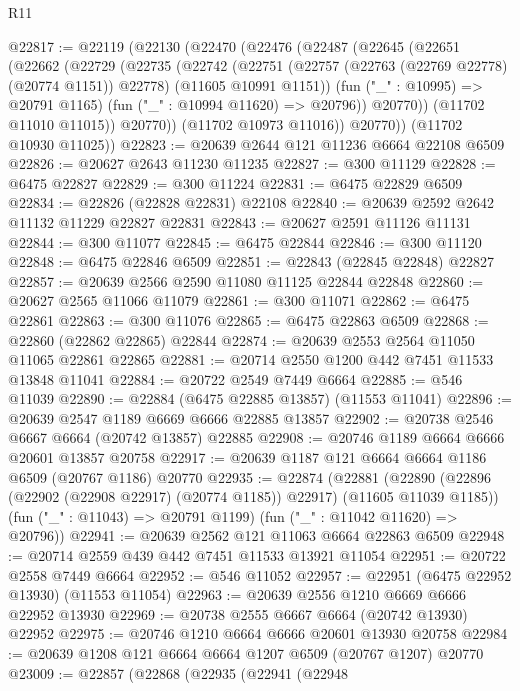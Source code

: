 \begin{lexlean}{R11}
\begin{coremodule}
{{{{{{{{{{{{{{{{{{{{{{{{{{{{{{{{{{{{{{{{{{{{{{{{{{{{{{{{{{{{{{{{{{{{{{{{{{{{{{{{{{@22817 := @22119
    (@22130
      (@22470
        (@22476
          (@22487
            (@22645
              (@22651
                (@22662
                  (@22729
                    (@22735
                      (@22742
                        (@22751
                          (@22757 (@22763 (@22769 @22778) (@20774 @1151)) @22778)
                          (@11605 @10991 @1151))
                        (fun ("_" : @10995) => @20791 @1165)
                        (fun ("_" : @10994 @11620) => @20796))
                      @20770))
                  (@11702 @11010 @11015))
                @20770))
            (@11702 @10973 @11016))
          @20770))
      (@11702 @10930 @11025))
@22823 := @20639 @2644 @121 @11236 @6664 @22108 @6509
@22826 := @20627 @2643 @11230 @11235
@22827 := @300 @11129
@22828 := @6475 @22827
@22829 := @300 @11224
@22831 := @6475 @22829 @6509
@22834 := @22826 (@22828 @22831) @22108
@22840 := @20639 @2592 @2642 @11132 @11229 @22827 @22831
@22843 := @20627 @2591 @11126 @11131
@22844 := @300 @11077
@22845 := @6475 @22844
@22846 := @300 @11120
@22848 := @6475 @22846 @6509
@22851 := @22843 (@22845 @22848) @22827
@22857 := @20639 @2566 @2590 @11080 @11125 @22844 @22848
@22860 := @20627 @2565 @11066 @11079
@22861 := @300 @11071
@22862 := @6475 @22861
@22863 := @300 @11076
@22865 := @6475 @22863 @6509
@22868 := @22860 (@22862 @22865) @22844
@22874 := @20639 @2553 @2564 @11050 @11065 @22861 @22865
@22881 := @20714 @2550 @1200 @442 @7451 @11533 @13848 @11041
@22884 := @20722 @2549 @7449 @6664
@22885 := @546 @11039
@22890 := @22884 (@6475 @22885 @13857) (@11553 @11041)
@22896 := @20639 @2547 @1189 @6669 @6666 @22885 @13857
@22902 := @20738 @2546 @6667 @6664 (@20742 @13857) @22885
@22908 := @20746 @1189 @6664 @6666 @20601 @13857 @20758
@22917 := @20639 @1187 @121 @6664 @6664 @1186 @6509 (@20767 @1186) @20770
@22935 := @22874
    (@22881
      (@22890 (@22896 (@22902 (@22908 @22917) (@20774 @1185)) @22917) (@11605 @11039 @1185))
      (fun ("_" : @11043) => @20791 @1199)
      (fun ("_" : @11042 @11620) => @20796))
@22941 := @20639 @2562 @121 @11063 @6664 @22863 @6509
@22948 := @20714 @2559 @439 @442 @7451 @11533 @13921 @11054
@22951 := @20722 @2558 @7449 @6664
@22952 := @546 @11052
@22957 := @22951 (@6475 @22952 @13930) (@11553 @11054)
@22963 := @20639 @2556 @1210 @6669 @6666 @22952 @13930
@22969 := @20738 @2555 @6667 @6664 (@20742 @13930) @22952
@22975 := @20746 @1210 @6664 @6666 @20601 @13930 @20758
@22984 := @20639 @1208 @121 @6664 @6664 @1207 @6509 (@20767 @1207) @20770
@23009 := @22857
    (@22868
      (@22935
        (@22941
          (@22948
}}}}}}}}}}}}}}}}}}}}}}}}}}}}}}}}}}}}}}}}}}}}}}}}}}}}}}}}}}}}}}}}}}}}}}}}}}}}}}}}}}
\end{coremodule}
\end{lexlean}
